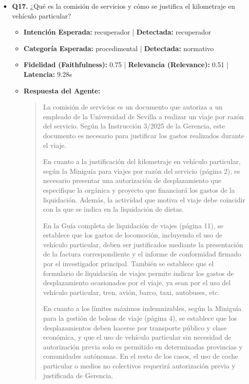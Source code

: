 \documentclass[12pt,a4paper,oneside]{report}
\begin{document}
\begin{itemize}
  
\item \textbf{Q17.} ¿Qué es la comisión de servicios y cómo se justifica el kilometraje en vehículo particular? \\
        \begin{itemize}
          \item \textbf{Intención Esperada:} recuperador | \textbf{Detectada:} recuperador
          \item \textbf{Categoría Esperada:} procedimental | \textbf{Detectada:} normativo
          \item \textbf{Fidelidad (Faithfulness):} 0.75 | \textbf{Relevancia (Relevance):} 0.51 | \textbf{Latencia:} 9.28s
          \item \textbf{{Respuesta del Agente:}} \\
                \begin{quote}
La comisión de servicios es un documento que autoriza a un empleado de la Universidad de Sevilla a realizar un viaje por razón del servicio. Según la Instrucción 3/2025 de la Gerencia, este documento es necesario para justificar los gastos realizados durante el viaje.

En cuanto a la justificación del kilometraje en vehículo particular, según la Miniguía para viajes por razón del servicio (página 2), es necesario presentar una autorización de desplazamiento que especifique la orgánica y proyecto que financiará los gastos de la liquidación. Además, la actividad que motiva el viaje debe coincidir con la que se indica en la liquidación de dietas.

En la Guía completa de liquidación de viajes (página 11), se establece que los gastos de locomoción, incluyendo el uso de vehículo particular, deben ser justificados mediante la presentación de la factura correspondiente y el informe de conformidad firmado por el investigador principal. También se establece que el formulario de liquidación de viajes permite indicar los gastos de desplazamiento ocasionados por el viaje, ya sean por el uso del vehículo particular, tren, avión, barco, taxi, autobuses, etc.

En cuanto a los límites máximos indemnizables, según la Miniguía para la gestión de bolsas de viaje (página 4), se establece que los desplazamientos deben hacerse por transporte público y clase económica, y que el uso de vehículo particular sin necesidad de autorización previa solo es permitido en determinadas provincias y comunidades autónomas. En el resto de los casos, el uso de coche particular o medios no colectivos requerirá autorización previa y justificada de Gerencia.


\end{quote}
\end{itemize}
\end{itemize}
\end{document}
